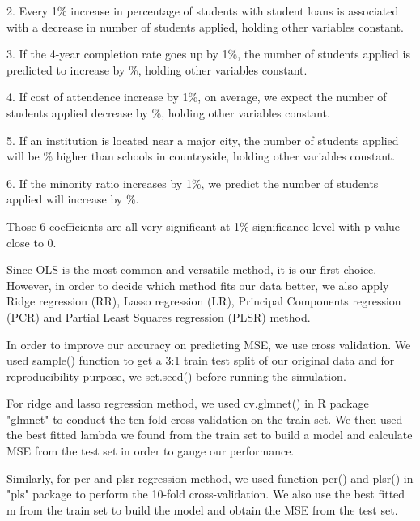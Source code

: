 \documentclass{article}
\begin{document}
2. Every 1\% increase in percentage of students with student loans is associated with a  decrease in number of students applied, holding other variables constant.

3. If the 4-year completion rate goes up by 1\%, the number of students applied is predicted to increase by \%, holding other variables constant.

4. If cost of attendence increase by 1\%, on average, we expect the number of students applied decrease by \%, holding other variables constant.

5. If an institution is located near a major city, the number of students applied will be \% higher than schools in countryside, holding other variables constant.

6. If the minority ratio increases by 1\%, we predict the number of students applied will increase by \%.

Those 6 coefficients are all very significant at 1\% significance level with p-value close to 0.

Since OLS is the most common and versatile method, it is our first choice. However, in order to decide which method fits our data better, we also apply Ridge regression (RR), Lasso regression (LR), Principal Components regression (PCR) and Partial Least Squares regression (PLSR) method.

In order to improve our accuracy on predicting MSE, we use cross validation. We used sample() function to get a 3:1 train test split of our original data and for reproducibility purpose, we set.seed() before running the simulation.

For ridge and lasso regression method, we used cv.glmnet() in R package "glmnet" to conduct the ten-fold cross-validation on the train set. We then used the best fitted lambda we found from the train set to build a model and calculate MSE from the test set in order to gauge our performance.

Similarly, for pcr and plsr regression method, we used function pcr() and plsr() in "pls" package to perform the 10-fold cross-validation. We also use the best fitted m from the train set to build the model and obtain the MSE from the test set.
\end{document}
